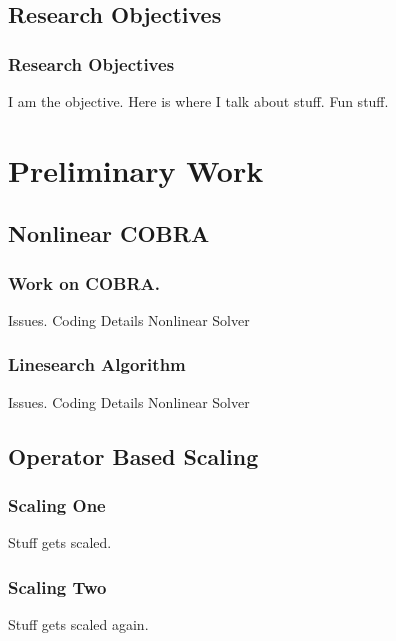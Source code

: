 \documentclass[compress]{beamer}
\begin{document}
\subsection[Research Objectives]{Research Objectives}
\begin{frame}
\frametitle{Research Objectives}

I am the objective.
Here is where I talk about stuff.
Fun stuff.

\end{frame}
\section[Preliminary Work]{Preliminary Work}
\subsection[COBRA]{Nonlinear COBRA}
\begin{frame}
\frametitle{Work on COBRA.}

Issues.
Coding Details
Nonlinear Solver


\end{frame}
\begin{frame}
\frametitle{Linesearch Algorithm}

Issues.
Coding Details
Nonlinear Solver


\end{frame}
\subsection[Scaling]{Operator Based Scaling}
\begin{frame}
\frametitle{Scaling One}

Stuff gets scaled.

\end{frame}
\begin{frame}
\frametitle{Scaling Two}

Stuff gets scaled again.

\end{frame}
\end{document}
